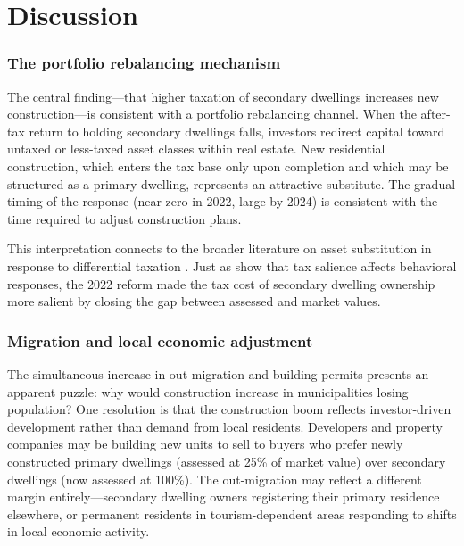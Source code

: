 \documentclass[12pt]{article}
\begin{document}


\section{Discussion}

\subsubsection*{The portfolio rebalancing mechanism} The central finding---that higher taxation of secondary dwellings increases new construction---is consistent with a portfolio rebalancing channel. When the after-tax return to holding secondary dwellings falls, investors redirect capital toward untaxed or less-taxed asset classes within real estate. New residential construction, which enters the tax base only upon completion and which may be structured as a primary dwelling, represents an attractive substitute. The gradual timing of the response (near-zero in 2022, large by 2024) is consistent with the time required to adjust construction plans.

This interpretation connects to the broader literature on asset substitution in response to differential taxation \citep{slemrod2002tax, kopczuk2019economics}. Just as \citet{chetty2009salience} show that tax salience affects behavioral responses, the 2022 reform made the tax cost of secondary dwelling ownership more salient by closing the gap between assessed and market values.

\subsubsection*{Migration and local economic adjustment} The simultaneous increase in out-migration and building permits presents an apparent puzzle: why would construction increase in municipalities losing population? One resolution is that the construction boom reflects investor-driven development rather than demand from local residents. Developers and property companies may be building new units to sell to buyers who prefer newly constructed primary dwellings (assessed at 25\% of market value) over secondary dwellings (now assessed at 100\%). The out-migration may reflect a different margin entirely---secondary dwelling owners registering their primary residence elsewhere, or permanent residents in tourism-dependent areas responding to shifts in local economic activity.
\end{document}
